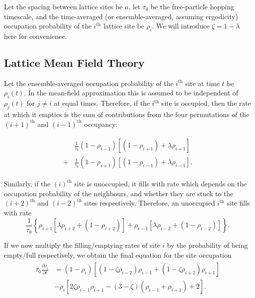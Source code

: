\documentclass[
reprint, amsmath,amssymb,
]{revtex4-1}
\newcommand{\partDeriv}[2]{\frac{\partial #1}{\partial #2}}
\begin{document}
Let the spacing between lattice
sites be $a$, let $\tau_0$ be the free-particle hopping timescale, and
the time-averaged (or ensemble-averaged, assuming ergodicity)
occupation probability of the $i^{\mathrm{th}}$ lattice site be
$\rho_i$.  We will introduce $\zeta = 1 - \lambda $ here for convenience.

\subsection{Lattice Mean Field Theory} Let the ensemble-averaged occupation
probability of the $i^\mathrm{th}$ site at time $t$ be $\rho_i
(t)$. In the mean-field approximation this is assumed to be
independent of $\rho_j(t)$ for $j \neq i $ at equal times. Therefore,
if the $i^\mathrm{th}$ site is occupied, then the rate at which it empties
is the sum of contributions from the
four permutations of the $(i+1)^\mathrm{th}$ and
$(i-1)^\mathrm{th}$ occupancy: 

\begin{align}
\begin{split}
 &\frac{1}{\tau_0 } (1-\rho_{i-1})\left[ (1 - \rho_{i+1}) + \lambda \rho_{i+1} \right] \\
 +&\frac{1}{\tau_0 } (1-\rho_{i+1})\left[ (1 - \rho_{i-1}) + \lambda \rho_{i-1} \right] .
\end{split}
 \end{align}

Similarly, if the $(i)^\mathrm{th}$ site is unoccupied, it fills with
rate which depends on the occupation probability of the neighbours,
and whether they are stuck to the $(i+2)^\mathrm{th}$ and $(i-2)^\mathrm{th}$ sites
respectively. Therefore, an unoccupied $i^\mathrm{th}$ site fills with rate
\begin{equation}
\frac{1}{\tau_0 } \left\{ \rho_{i+1} \left[ \lambda \rho_{i+2} + (1-\rho_{i+2}) \right] + \rho_{i-1} \left[ \lambda \rho_{i-2} + (1-\rho_{i-2}) \right] \right\}.
\end{equation}

If we now multiply the filling/emptying rates of site $i$ by the
probability of being empty/full respectively, we obtain the
final equation for the site occupation 
\begin{align}
\label{eq:latticeMFT}
\begin{split}
 \tau_0 \partDeriv{\rho_i}{t} &= \left( 1-\rho_i \right) \left[ \left(1-\zeta\rho_{i-2} \right) \rho_{i-1} + \left(1-\zeta\rho_{i+2} \right) \rho_{i+1} \right] \\
 &- \rho_i \left[ 2 \zeta \rho_{i-1} \rho_{i+1}  - (3-\zeta)\left(\rho_{i-1} + \rho_{i+1}\right) + 2 \right].
 \end{split}
 \end{align}
\end{document}
